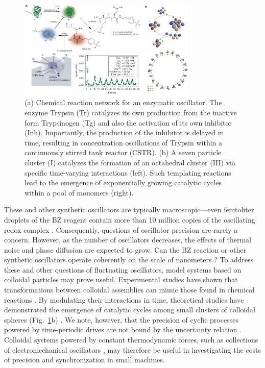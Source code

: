 \begin{appendices}
\begin{figure}[h!]
    \centering
    \includegraphics[width=8.5cm]{figures/A5_KeepingTime2.pdf}
    \caption{(a) Chemical reaction network for an enzymatic oscillator.  The enzyme Trypsin (Tr) catalyzes its own production from the inactive form Trypsinogen (Tg) and also the activation of its own inhibitor (Inh). Importantly, the production of the inhibitor is delayed in time, resulting in concentration oscillations of Trypsin within a continuously stirred tank reactor (CSTR).  (b) A seven particle cluster (I) catalyzes the formation of an octahedral cluster (III) via specific time-varying interactions (left). Such templating reactions lead to the emergence of  exponentially growing catalytic cycles within a pool of monomers (right). }
    \label{fig:KeepingTime2}
\end{figure}

These and other synthetic oscillators are typically macroscopic---even femtoliter droplets of the BZ reagent contain more than 10 million copies of the oscillating redox complex \autocite{Toiya2010, Tompkins2014}. Consequently, questions of oscillator precision are rarely a concern. However, as the number of oscillators decreases, the effects of thermal noise and phase diffusion are expected to grow. Can the BZ reaction or other synthetic oscillators operate coherently on the scale of nanometers \autocite{Epstein2016}?  To address these and other questions of fluctuating oscillators, model systems based on colloidal particles may prove useful. Experimental studies have shown that transformations between colloidal assemblies can mimic those found in chemical reactions \autocite{Meng2010, Chen2011}. By modulating their interactions in time, theoretical studies have demonstrated the emergence of catalytic cycles among small clusters of colloidal spheres (Fig.~\ref{fig:KeepingTime2}b) \autocite{Zeravcic2017, zeravcic2017colloquium}. We note, however, that the precision of cyclic processes powered by time-periodic drives are not bound by the uncertainty relation \autocite{Barato2016}. Colloidal systems powered by constant thermodynamic forces, such as collections of electromechanical oscillators \autocite{Dou2018}, may therefore be useful in investigating the costs of precision and synchronization in small machines.


\end{appendices}
